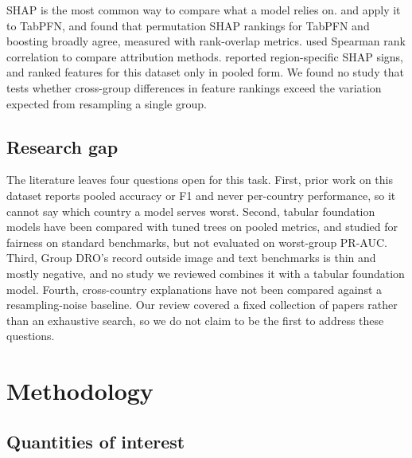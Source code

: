 \documentclass[11pt]{article}
\begin{document}
SHAP is the most common way to compare what a model relies on. \citet{hollmann2025accurate} and \citet{shan2026tabpfn} apply it to TabPFN, and \citet{shaktah2026established} found that permutation SHAP rankings for TabPFN and boosting broadly agree, measured with rank-overlap metrics. \citet{borisov2024deep} used Spearman rank correlation to compare attribution methods. \citet{chen2026evaluating} reported region-specific SHAP signs, and \citet{ismail2021using} ranked features for this dataset only in pooled form. We found no study that tests whether cross-group differences in feature rankings exceed the variation expected from resampling a single group.

\subsection{Research gap}

The literature leaves four questions open for this task. First, prior work on this dataset reports pooled accuracy or F1 and never per-country performance, so it cannot say which country a model serves worst. Second, tabular foundation models have been compared with tuned trees on pooled metrics, and studied for fairness on standard benchmarks, but not evaluated on worst-group PR-AUC. Third, Group DRO's record outside image and text benchmarks is thin and mostly negative, and no study we reviewed combines it with a tabular foundation model. Fourth, cross-country explanations have not been compared against a resampling-noise baseline. Our review covered a fixed collection of papers rather than an exhaustive search, so we do not claim to be the first to address these questions.

\section{Methodology}
\label{sec:method}

\subsection{Quantities of interest}
\end{document}
